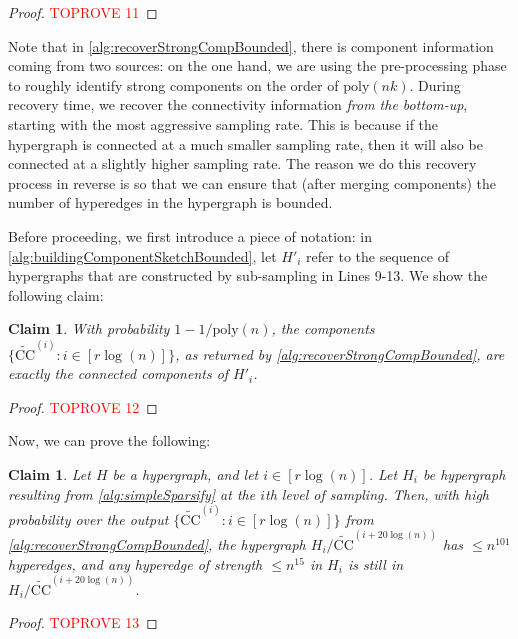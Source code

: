 \documentclass[11pt]{article}
\newtheorem{claim}[theorem]{Claim}
\theoremstyle{definition}
\begin{document}
\begin{proof}\textcolor{red}{TOPROVE 11}\end{proof}

Note that in \cref{alg:recoverStrongCompBounded}, there is component information coming from two sources: on the one hand, we are using the pre-processing phase to roughly identify strong components on the order of $\mathrm{poly}(nk)$. During recovery time, we recover the connectivity information \emph{from the bottom-up}, starting with the most aggressive sampling rate. This is because if the hypergraph is connected at a much smaller sampling rate, then it will also be connected at a slightly higher sampling rate. The reason we do this recovery process in reverse is so that we can ensure that (after merging components) the number of hyperedges in the hypergraph is bounded. 

Before proceeding, we first introduce a piece of notation: in \cref{alg:buildingComponentSketchBounded}, let $H'_i$ refer to the sequence of hypergraphs that are constructed by sub-sampling in Lines 9-13. We show the following claim:

\begin{claim}\label{clm:componentRecovery}
	With probability $1 - 1  / \mathrm{poly}(n)$, the components $\{\widetilde{\mathrm{CC}}^{(i)}: i \in [r \log(n)]\}$, as returned by \cref{alg:recoverStrongCompBounded}, are exactly the connected components of $H'_i$.
\end{claim}

\begin{proof}\textcolor{red}{TOPROVE 12}\end{proof}

Now, we can prove the following:

\begin{claim}\label{clm:boundedHyperedgesBoundedDeletion}
	Let $H$ be a hypergraph, and let $i \in [r \log(n)]$. Let $H_i$ be hypergraph resulting from \cref{alg:simpleSparsify} at the $i$th level of sampling. Then, with high probability over the output $\{\widetilde{\mathrm{CC}}^{(i)}: i \in [r \log(n)]\}$ from \cref{alg:recoverStrongCompBounded}, the hypergraph $H_i /  \widetilde{\mathrm{CC}}^{(i + 20 \log(n))}$ has $\leq n^{101}$ hyperedges, and any hyperedge of strength $\leq n^{15}$ in $H_i$ is still in $H_i /  \widetilde{\mathrm{CC}}^{(i + 20 \log(n))}$.
\end{claim}

\begin{proof}\textcolor{red}{TOPROVE 13}\end{proof}
\end{document}
